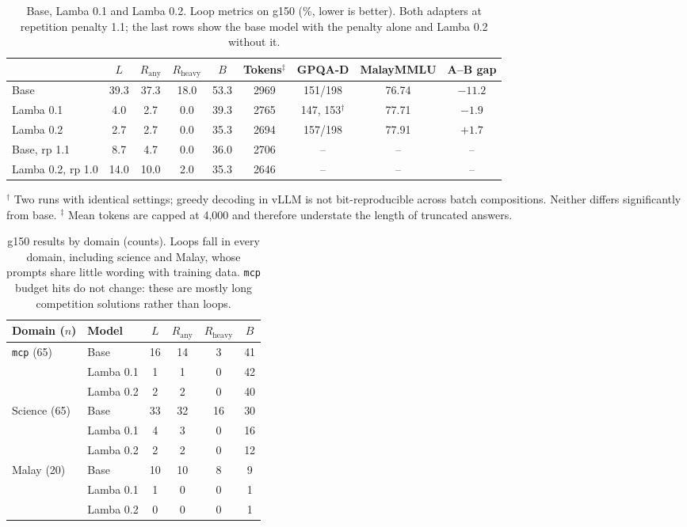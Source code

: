 \documentclass[11pt]{article}
\newcommand{\Rany}{R_{\text{any}}}
\newcommand{\Rheavy}{R_{\text{heavy}}}
\begin{document}
\begin{table}[t]
\centering
\small
\caption{Base, Lamba 0.1 and Lamba 0.2. Loop metrics on g150 (\%, lower is better). Both adapters at repetition penalty 1.1; the last rows show the base model with the penalty alone and Lamba 0.2 without it.}
\label{tab:versions}
\begin{tabular}{lcccccccc}
\toprule
 & $L$ & $\Rany$ & $\Rheavy$ & $B$ & Tokens$^\ddagger$ & GPQA-D & MalayMMLU & A--B gap \\
\midrule
Base & 39.3 & 37.3 & 18.0 & 53.3 & 2969 & 151/198 & 76.74 & $-11.2$ \\
Lamba 0.1 & 4.0 & 2.7 & 0.0 & 39.3 & 2765 & 147, 153$^\dagger$ & 77.71 & $-1.9$ \\
Lamba 0.2 & 2.7 & 2.7 & 0.0 & 35.3 & 2694 & 157/198 & 77.91 & $+1.7$ \\
\midrule
Base, rp 1.1 & 8.7 & 4.7 & 0.0 & 36.0 & 2706 & -- & -- & -- \\
Lamba 0.2, rp 1.0 & 14.0 & 10.0 & 2.0 & 35.3 & 2646 & -- & -- & -- \\
\bottomrule
\end{tabular}

\smallskip
\footnotesize $^\dagger$ Two runs with identical settings; greedy decoding in vLLM is not bit-reproducible across batch compositions. Neither differs significantly from base. $^\ddagger$ Mean tokens are capped at 4,000 and therefore understate the length of truncated answers.
\end{table}

\begin{table}[t]
\centering
\small
\caption{g150 results by domain (counts). Loops fall in every domain, including science and Malay, whose prompts share little wording with training data. \texttt{mcp} budget hits do not change: these are mostly long competition solutions rather than loops.}
\label{tab:domain}
\begin{tabular}{llcccc}
\toprule
Domain ($n$) & Model & $L$ & $\Rany$ & $\Rheavy$ & $B$ \\
\midrule
\multirow{3}{*}{\texttt{mcp} (65)} & Base & 16 & 14 & 3 & 41 \\
 & Lamba 0.1 & 1 & 1 & 0 & 42 \\
 & Lamba 0.2 & 2 & 2 & 0 & 40 \\
\midrule
\multirow{3}{*}{Science (65)} & Base & 33 & 32 & 16 & 30 \\
 & Lamba 0.1 & 4 & 3 & 0 & 16 \\
 & Lamba 0.2 & 2 & 2 & 0 & 12 \\
\midrule
\multirow{3}{*}{Malay (20)} & Base & 10 & 10 & 8 & 9 \\
 & Lamba 0.1 & 1 & 0 & 0 & 1 \\
 & Lamba 0.2 & 0 & 0 & 0 & 1 \\
\bottomrule
\end{tabular}
\end{table}
\end{document}

